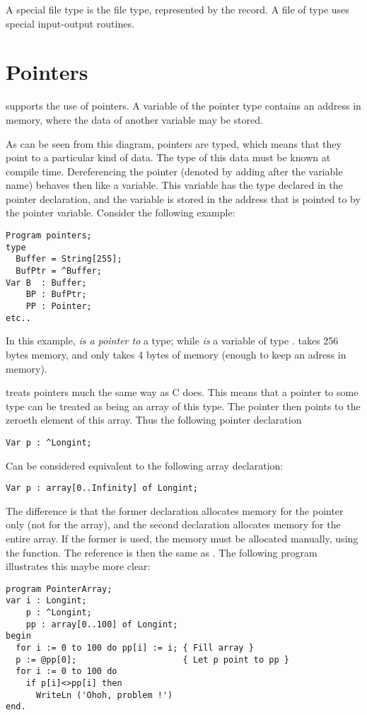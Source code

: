 A special file type is the  file type, represented by the
 record. A file of type  uses special input-output
routines.

\section{Pointers}
\fpc supports the use of pointers. A variable of the pointer type
contains an address in memory, where the data of another variable may be
stored.

As can be seen from this diagram, pointers are typed, which means that
they point to a particular kind of data. The type of this data must be
known at compile time.
Dereferencing the pointer (denoted by adding \var{\^{}} after the variable
name) behaves then like a variable. This variable has the type declared in
the pointer declaration, and the variable is stored in the address that is
pointed to by the pointer variable.
Consider the following example:
\begin{verbatim}
Program pointers;
type
  Buffer = String[255];
  BufPtr = ^Buffer;
Var B  : Buffer;
    BP : BufPtr;
    PP : Pointer;
etc..
\end{verbatim}
In this example,  {\em is a pointer to} a  type; while 
{\em is} a variable of type .  takes 256 bytes memory,
and  only takes 4 bytes of memory (enough to keep an adress in
memory).
\begin{remark} \fpc treats pointers much the same way as C does. This means
that a pointer to some type can be treated as being an array of this type.
The pointer then points to the zeroeth element of this array. Thus the
following pointer declaration
\begin{verbatim}
Var p : ^Longint;
\end{verbatim}
Can be considered equivalent to the following array declaration:
\begin{verbatim}
Var p : array[0..Infinity] of Longint;
\end{verbatim}
The difference is that the former declaration allocates memory for the
pointer only (not for the array), and the second declaration allocates
memory for the entire array. If the former is used, the memory must be
allocated manually, using the  function.
The reference  is then the same as . The following program
illustrates this maybe more clear:
\begin{verbatim}
program PointerArray;
var i : Longint;
    p : ^Longint;
    pp : array[0..100] of Longint;
begin
  for i := 0 to 100 do pp[i] := i; { Fill array }
  p := @pp[0];                     { Let p point to pp }
  for i := 0 to 100 do
    if p[i]<>pp[i] then
      WriteLn ('Ohoh, problem !')
end.
\end{verbatim}
\end{remark}
